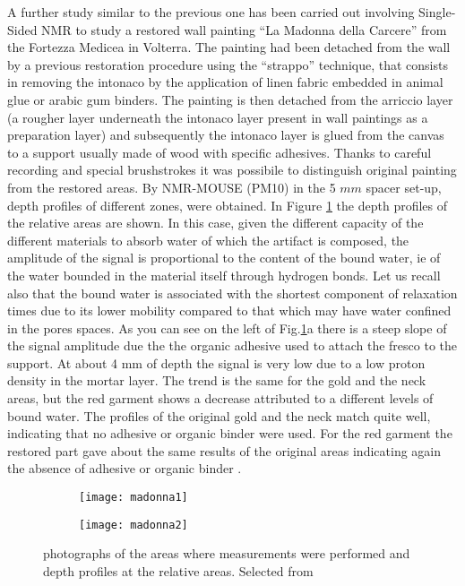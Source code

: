 \documentclass[a4paper,11pt]{report}
\begin{document}
A further study similar to the previous one has been carried out involving Single-Sided NMR to study a restored wall painting “La Madonna della Carcere” from the Fortezza Medicea in Volterra\cite{cinquefresco}. The painting had been detached from the wall by a previous restoration procedure using the “strappo” technique, that consists in removing the intonaco by the application of linen fabric embedded in animal glue or arabic gum binders. The painting is then detached from the arriccio layer (a rougher layer underneath the intonaco layer present in wall paintings as a preparation layer) and  subsequently the intonaco layer is  glued from the canvas to a support usually made of wood with specific adhesives\cite{cinquefresco}. Thanks to careful recording and special brushstrokes it was possibile to distinguish original painting from the restored areas. By NMR-MOUSE (PM10) in the 5 $mm$ spacer set-up, depth profiles of different zones, were obtained. In Figure \ref{madonna} the depth profiles of the relative areas are shown. In this case, given the different capacity of the different materials to absorb water of which the artifact is composed, the amplitude of the signal is proportional to the content of the bound water, ie of the water bounded in the material itself through hydrogen bonds. Let us recall also that the bound water is associated with the shortest component of relaxation times due to its lower mobility compared to that which may have water confined in the pores spaces. As you can see on the left of Fig.\ref{madonna}a there is a steep slope of the signal amplitude due the the organic adhesive used to attach the fresco to the support. At about 4 mm of depth the signal is very low due to a low proton density in the mortar layer. The trend is the same for the gold and the neck areas, but the red garment shows a decrease attributed to a different levels of bound water. The profiles of the original gold and the neck match quite well, indicating that no adhesive or organic binder were used. For the red garment the restored part gave about the same results of the original areas indicating again the absence of adhesive or organic binder .   
\begin{figure}[h]
	\begin{subfigure}{0.5\textwidth}
\texttt{[image: madonna1]} 
\caption{}
\end{subfigure}
\begin{subfigure}{0.5\textwidth}
\texttt{[image: madonna2]}
\caption{}
\end{subfigure}
\caption{photographs of the areas where measurements were performed and depth profiles at the relative areas. Selected from \cite{cinquefresco}} \label{madonna}
\end{figure}
\end{document}
